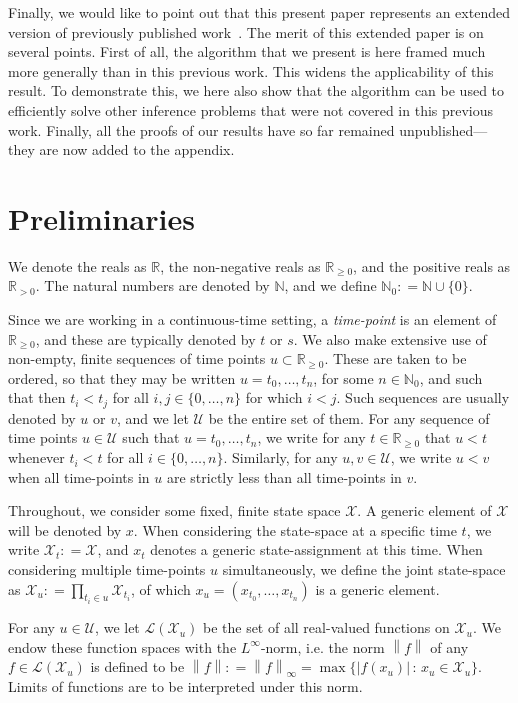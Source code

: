 \documentclass[3p]{elsarticle}
\newcommand{\nats}{\mathbb{N}}
\newcommand{\natswith}{\nats_{0}}
\newcommand{\reals}{\mathbb{R}}
\newcommand{\realspos}{\reals_{>0}}
\newcommand{\realsnonneg}{\reals_{\geq 0}}
\newcommand{\states}{\mathcal{X}}
\newcommand{\gambles}{\mathcal{L}}
\newcommand{\norm}[1]{\left\lVert #1 \right\rVert}
\newcommand{\abs}[1]{\left\vert #1 \right\vert}
\newcommand{\coloneqq}{:\!=}
\begin{document}
Finally, we would like to point out that this present paper represents an extended version of previously published work~\cite{krak2017icthmc}. The merit of this extended paper is on several points. First of all, the algorithm that we present is here framed much more generally than in this previous work. This widens the applicability of this result. To demonstrate this, we here also show that the algorithm can be used to efficiently solve other inference problems that were not covered in this previous work. Finally, all the proofs of our results have so far remained unpublished---they are now added to the appendix.

\section{Preliminaries}\label{sec:prelim}

We denote the reals as $\reals$, the non-negative reals as $\realsnonneg$, and the positive reals as $\realspos$. The natural numbers are denoted by $\nats$, and we define $\natswith\coloneqq\nats\cup\{0\}$.

Since we are working in a continuous-time setting, a \emph{time-point} is an element of $\realsnonneg$, and these are typically denoted by $t$ or $s$. We also make extensive use of non-empty, finite sequences of time points $u\subset\realsnonneg$. These are taken to be ordered, so that they may be written $u=t_0,\ldots,t_n$, for some $n\in\natswith$, and such that then $t_i<t_j$ for all $i,j\in\{0,\ldots,n\}$ for which $i< j$. Such sequences are usually denoted by $u$ or $v$, and we let $\mathcal{U}$ be the entire set of them. For any sequence of time points $u\in\mathcal{U}$ such that $u=t_0,\ldots,t_n$, we write for any $t\in\realsnonneg$ that $u<t$ whenever $t_i<t$ for all $i\in\{0,\ldots,n\}$. Similarly, for any $u,v\in\mathcal{U}$, we write $u< v$ when all time-points in $u$ are strictly less than all time-points in $v$.

Throughout, we consider some fixed, finite state space $\states$. A generic element of $\states$ will be denoted by $x$. When considering the state-space at a specific time $t$, we write $\states_t\coloneqq\states$, and $x_t$ denotes a generic state-assignment at this time. When considering multiple time-points $u$ simultaneously, we define the joint state-space as $\states_u\coloneqq\prod_{t_i\in u}\states_{t_i}$, of which $x_u=(x_{t_0},\ldots,x_{t_n})$ is a generic element.

For any $u\in\mathcal{U}$, we let $\gambles(\states_u)$ be the set of all real-valued functions on $\states_u$. We endow these function spaces with the $L^\infty$-norm, i.e. the norm $\norm{f}$ of any $f\in\gambles(\states_u)$ is defined to be $\norm{f}\coloneqq\norm{f}_\infty=\max\{\abs{f(x_u)}\,:\,x_u\in\states_u\}$. Limits of functions are to be interpreted under this norm.
\end{document}
